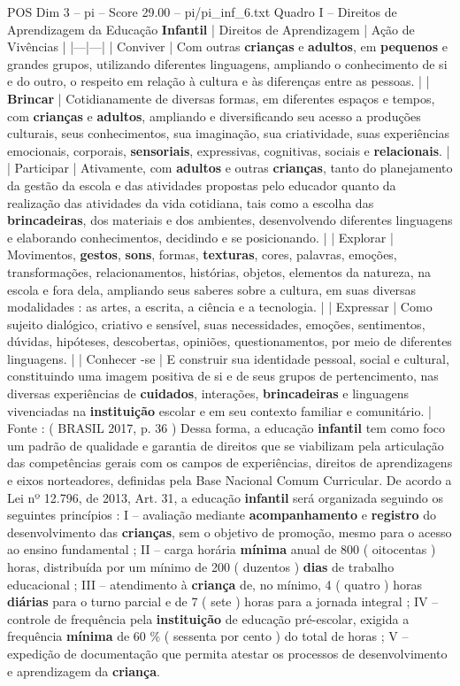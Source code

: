 \begin{textsample}{POS Dim 3 – pi – Score 29.00 – pi/pi\_inf\_6.txt}
Quadro I – Direitos de Aprendizagem da Educação \textbf{Infantil} | Direitos de Aprendizagem | Ação de Vivências | |---|---| | Conviver | Com outras \textbf{crianças} e \textbf{adultos}, em \textbf{pequenos} e grandes grupos, utilizando diferentes linguagens, ampliando o conhecimento de si e do outro, o respeito em relação à cultura e às diferenças entre as pessoas. | | \textbf{Brincar} | Cotidianamente de diversas formas, em diferentes espaços e tempos, com \textbf{crianças} e \textbf{adultos}, ampliando e diversificando seu acesso a produções culturais, seus conhecimentos, sua imaginação, sua criatividade, suas experiências emocionais, corporais, \textbf{sensoriais}, expressivas, cognitivas, sociais e \textbf{relacionais}. | | Participar | Ativamente, com \textbf{adultos} e outras \textbf{crianças}, tanto do planejamento da gestão da escola e das atividades propostas pelo educador quanto da realização das atividades da vida cotidiana, tais como a escolha das \textbf{brincadeiras}, dos materiais e dos ambientes, desenvolvendo diferentes linguagens e elaborando conhecimentos, decidindo e se posicionando. | | Explorar | Movimentos, \textbf{gestos}, \textbf{sons}, formas, \textbf{texturas}, cores, palavras, emoções, transformações, relacionamentos, histórias, objetos, elementos da natureza, na escola e fora dela, ampliando seus saberes sobre a cultura, em suas diversas modalidades : as artes, a escrita, a ciência e a tecnologia. | | Expressar | Como sujeito dialógico, criativo e sensível, suas necessidades, emoções, sentimentos, dúvidas, hipóteses, descobertas, opiniões, questionamentos, por meio de diferentes linguagens. | | Conhecer -se | E construir sua identidade pessoal, social e cultural, constituindo uma imagem positiva de si e de seus grupos de pertencimento, nas diversas experiências de \textbf{cuidados}, interações, \textbf{brincadeiras} e linguagens vivenciadas na \textbf{instituição} escolar e em seu contexto familiar e comunitário. | Fonte : ( BRASIL 2017, p. 36 ) Dessa forma, a educação \textbf{infantil} tem como foco um padrão de qualidade e garantia de direitos que se viabilizam pela articulação das competências gerais com os campos de experiências, direitos de aprendizagens e eixos norteadores, definidas pela Base Nacional Comum Curricular.
De acordo a Lei nº 12.796, de 2013, Art. 31, a educação \textbf{infantil} será organizada seguindo os seguintes princípios : I – avaliação mediante \textbf{acompanhamento} e \textbf{registro} do desenvolvimento das \textbf{crianças}, sem o objetivo de promoção, mesmo para o acesso ao ensino fundamental ; II – carga horária \textbf{mínima} anual de 800 ( oitocentas ) horas, distribuída por um mínimo de 200 ( duzentos ) \textbf{dias} de trabalho educacional ; III – atendimento à \textbf{criança} de, no mínimo, 4 ( quatro ) horas \textbf{diárias} para o turno parcial e de 7 ( sete ) horas para a jornada integral ; IV – controle de frequência pela \textbf{instituição} de educação pré-escolar, exigida a frequência \textbf{mínima} de 60 \% ( sessenta por cento ) do total de horas ; V – expedição de documentação que permita atestar os processos de desenvolvimento e aprendizagem da \textbf{criança}.

\end{textsample}
